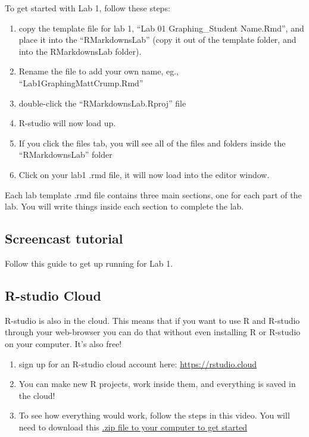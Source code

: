 \documentclass[]{book}
\providecommand{\tightlist}{%
  \setlength{\itemsep}{0pt}\setlength{\parskip}{0pt}}
\begin{document}
To get started with Lab 1, follow these steps:

\begin{enumerate}
\def\labelenumi{\arabic{enumi}.}
\tightlist
\item
  copy the template file for lab 1, ``Lab 01 Graphing\_Student
  Name.Rmd'', and place it into the ``RMarkdownsLab'' (copy it out of
  the template folder, and into the RMarkdownsLab folder).
\item
  Rename the file to add your own name, eg.,
  ``Lab1GraphingMattCrump.Rmd''
\item
  double-click the ``RMarkdownsLab.Rproj'' file
\item
  R-studio will now load up.
\item
  If you click the files tab, you will see all of the files and folders
  inside the ``RMarkdownsLab'' folder
\item
  Click on your lab1 .rmd file, it will now load into the editor window.
\end{enumerate}

Each lab template .rmd file contains three main sections, one for each
part of the lab. You will write things inside each section to complete
the lab.

\subsection{Screencast tutorial}\label{screencast-tutorial}

Follow this guide to get up running for Lab 1.

\subsection{R-studio Cloud}\label{r-studio-cloud}

R-studio is also in the cloud. This means that if you want to use R and
R-studio through your web-browser you can do that without even
installing R or R-studio on your computer. It's also free!

\begin{enumerate}
\def\labelenumi{\arabic{enumi}.}
\item
  sign up for an R-studio cloud account here:
  \url{https://rstudio.cloud}
\item
  You can make new R projects, work inside them, and everything is saved
  in the cloud!
\item
  To see how everything would work, follow the steps in this video. You
  will need to download this
  \href{https://github.com/CrumpLab/statisticsLab/raw/master/RstudioCloud.zip}{.zip
  file to your computer to get started}
\end{enumerate}
\end{document}
